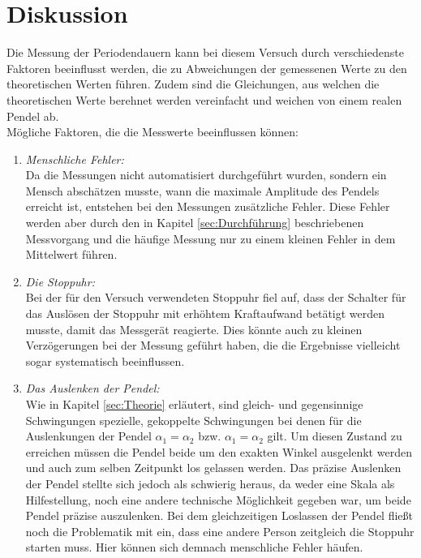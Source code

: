 \section{Diskussion}
\label{sec:Diskussion}

Die Messung der Periodendauern kann bei diesem Versuch durch verschiedenste Faktoren beeinflusst werden, die zu Abweichungen
der gemessenen Werte zu den theoretischen Werten führen. Zudem sind die Gleichungen, aus welchen die theoretischen Werte 
berehnet werden vereinfacht und weichen von einem realen Pendel ab.\\ 
Mögliche Faktoren, die die Messwerte beeinflussen können:
\begin{enumerate}
    \item \textit{Menschliche Fehler:}\\
        Da die Messungen nicht automatisiert durchgeführt wurden, sondern ein Mensch abschätzen musste, wann die maximale 
        Amplitude des Pendels erreicht ist, entstehen bei den Messungen zusätzliche Fehler. Diese Fehler werden aber durch den in Kapitel
        \ref{sec:Durchführung} beschriebenen Messvorgang und die häufige Messung nur zu einem kleinen Fehler in dem Mittelwert
        führen.
    \item \textit{Die Stoppuhr:}\\
        Bei der für den Versuch verwendeten Stoppuhr fiel auf, dass der Schalter für das Auslösen der Stoppuhr mit erhöhtem 
        Kraftaufwand betätigt werden musste, damit das Messgerät reagierte. Dies könnte auch zu kleinen Verzögerungen bei der 
        Messung geführt haben, die die Ergebnisse vielleicht sogar systematisch beeinflussen.
    \item \textit{Das Auslenken der Pendel:}\\
        Wie in Kapitel \ref{sec:Theorie} erläutert, sind gleich- und gegensinnige Schwingungen spezielle, gekoppelte Schwingungen bei 
        denen für die Auslenkungen der Pendel $\alpha_1=\alpha_2$ bzw. $\alpha_1=\alpha_2$ gilt. Um diesen Zustand zu erreichen
        müssen die Pendel beide um den exakten Winkel ausgelenkt werden und auch zum selben Zeitpunkt los gelassen werden. Das 
        präzise Auslenken der Pendel stellte sich jedoch als schwierig heraus, da weder eine Skala als Hilfestellung, noch 
        eine andere technische Möglichkeit gegeben war, um beide Pendel präzise auszulenken. Bei dem gleichzeitigen Loslassen
        der Pendel fließt noch die Problematik mit ein, dass eine andere Person zeitgleich die Stoppuhr starten muss. Hier 
        können sich demnach menschliche Fehler häufen.
\end{enumerate}
